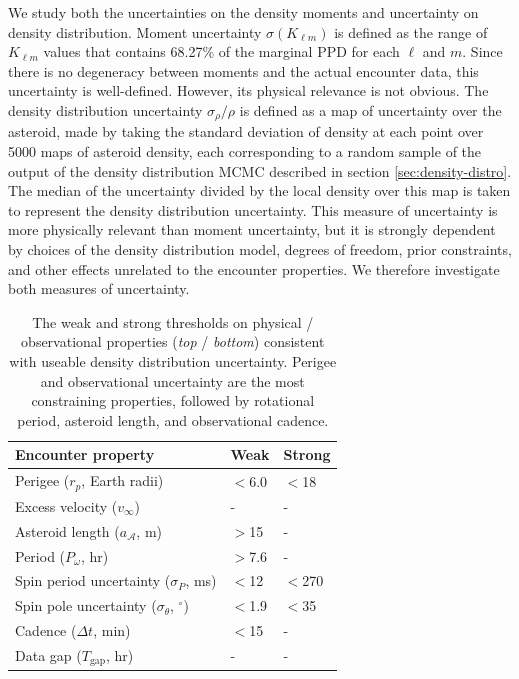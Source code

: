 \documentclass[fleqn,usenatbib]{mnras}
\begin{document}
We study both the uncertainties on the density moments and uncertainty on density distribution. Moment uncertainty $\sigma (K_{\ell m})$ is defined as the range of $K_{\ell m}$ values that contains 68.27\% of the marginal PPD for each $\ell$ and $m$. Since there is no degeneracy between moments and the actual encounter data, this uncertainty is well-defined. However, its physical relevance is not obvious. The density distribution uncertainty $\sigma_\rho / \rho$ is defined as a map of uncertainty over the asteroid, made by taking the standard deviation of density at each point over 5000 maps of asteroid density, each corresponding to a random sample of the output of the density distribution MCMC described in section \ref{sec:density-distro}. The median of the uncertainty divided by the local density over this map is taken to represent the density distribution uncertainty. This measure of uncertainty is more physically relevant than moment uncertainty, but it is strongly dependent by choices of the density distribution model, degrees of freedom, prior constraints, and other effects unrelated to the encounter properties. We therefore investigate both measures of uncertainty. 

\begin{table}
  \centering
  \begin{tabular}{lll} \hline
    Encounter property & Weak &Strong \\ \hline
    Perigee ($r_p$, Earth radii) & $<$6.0 & $<$18\\
    Excess velocity ($v_\infty$) & - & - \\
    Asteroid length ($a_\mathcal{A}$, m) & $>$15 & - \\
    Period ($P_\omega$, hr) & $>$7.6 & - \\ \hline
    Spin period uncertainty ($\sigma_P$, ms) & $<$12 & $<$270\\
    Spin pole uncertainty ($\sigma_\theta$, $^\circ$) & $<$1.9 & $<$35 \\
    Cadence ($\Delta t$, min) & $<$15 & - \\
    Data gap ($T_\text{gap}$, hr) & - & - \\ 
    \hline
  \end{tabular}
  \caption{The weak and strong thresholds on physical / observational properties (\textit{top} / \textit{bottom}) consistent with useable density distribution uncertainty. Perigee and observational uncertainty are the most constraining properties, followed by rotational period, asteroid length, and observational cadence.}
  \label{tab:threshold-summary}
\end{table}
\end{document}
